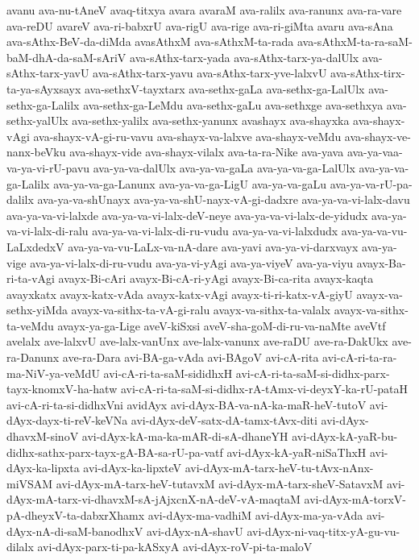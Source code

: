 {avanu
ava-nu-tAneV
avaq-titxya
avara
avaraM
ava-ralilx
ava-ranunx
ava-ra-vare
ava-reDU
avareV
ava-ri-babxrU
ava-rigU
ava-rige
ava-ri-giMta
avaru
ava-sAna
ava-sAthx-BeV-da-diMda
avasAthxM
ava-sAthxM-ta-rada
ava-sAthxM-ta-ra-saM-baM-dhA-da-saM-sAriV
ava-sAthx-tarx-yada
ava-sAthx-tarx-ya-dalUlx
ava-sAthx-tarx-yavU
ava-sAthx-tarx-yavu
ava-sAthx-tarx-yve-lalxvU
ava-sAthx-tirx-ta-ya-sAyxsayx
ava-sethxV-tayxtarx
ava-sethx-gaLa
ava-sethx-ga-LalUlx
ava-sethx-ga-Lalilx
ava-sethx-ga-LeMdu
ava-sethx-gaLu
ava-sethxge
ava-sethxya
ava-sethx-yalUlx
ava-sethx-yalilx
ava-sethx-yanunx
avashayx
ava-shayxka
ava-shayx-vAgi
ava-shayx-vA-gi-ru-vavu
ava-shayx-va-lalxve
ava-shayx-veMdu
ava-shayx-ve-nanx-beVku
ava-shayx-vide
ava-shayx-vilalx
ava-ta-ra-Nike
ava-yava
ava-ya-vaa-va-ya-vi-rU-pavu
ava-ya-va-dalUlx
ava-ya-va-gaLa
ava-ya-va-ga-LalUlx
ava-ya-va-ga-Lalilx
ava-ya-va-ga-Lanunx
ava-ya-va-ga-LigU
ava-ya-va-gaLu
ava-ya-va-rU-pa-dalilx
ava-ya-va-shUnayx
ava-ya-va-shU-nayx-vA-gi-dadxre
ava-ya-va-vi-lalx-davu
ava-ya-va-vi-lalxde
ava-ya-va-vi-lalx-deV-neye
ava-ya-va-vi-lalx-de-yidudx
ava-ya-va-vi-lalx-di-ralu
ava-ya-va-vi-lalx-di-ru-vudu
ava-ya-va-vi-lalxdudx
ava-ya-va-vu-LaLxdedxV
ava-ya-va-vu-LaLx-va-nA-dare
ava-yavi
ava-ya-vi-darxvayx
ava-ya-vige
ava-ya-vi-lalx-di-ru-vudu
ava-ya-vi-yAgi
ava-ya-viyeV
ava-ya-viyu
avayx-Ba-ri-ta-vAgi
avayx-Bi-cAri
avayx-Bi-cA-ri-yAgi
avayx-Bi-ca-rita
avayx-kaqta
avayxkatx
avayx-katx-vAda
avayx-katx-vAgi
avayx-ti-ri-katx-vA-giyU
avayx-va-sethx-yiMda
avayx-va-sithx-ta-vA-gi-ralu
avayx-va-sithx-ta-valalx
avayx-va-sithx-ta-veMdu
avayx-ya-ga-Lige
aveV-kiSxsi
aveV-sha-goM-di-ru-va-naMte
aveVtf
avelalx
ave-lalxvU
ave-lalx-vanUnx
ave-lalx-vanunx
ave-raDU
ave-ra-DakUkx
ave-ra-Danunx
ave-ra-Dara
avi-BA-ga-vAda
avi-BAgoV
avi-cA-rita
avi-cA-ri-ta-ra-ma-NiV-ya-veMdU
avi-cA-ri-ta-saM-sididhxH
avi-cA-ri-ta-saM-si-didhx-parx-tayx-knomxV-ha-hatw
avi-cA-ri-ta-saM-si-didhx-rA-tAmx-vi-deyxY-ka-rU-pataH
avi-cA-ri-ta-si-didhxVni
avidAyx
avi-dAyx-BA-va-nA-ka-maR-heV-tutoV
avi-dAyx-dayx-ti-reV-keVNa
avi-dAyx-deV-satx-dA-tamx-tAvx-diti
avi-dAyx-dhavxM-sinoV
avi-dAyx-kA-ma-ka-mAR-di-sA-dhaneYH
avi-dAyx-kA-yaR-bu-didhx-sathx-parx-tayx-gA-BA-sa-rU-pa-vatf
avi-dAyx-kA-yaR-niSaThxH
avi-dAyx-ka-lipxta
avi-dAyx-ka-lipxteV
avi-dAyx-mA-tarx-heV-tu-tAvx-nAnx-miVSAM
avi-dAyx-mA-tarx-heV-tutavxM
avi-dAyx-mA-tarx-sheV-SatavxM
avi-dAyx-mA-tarx-vi-dhavxM-sA-jAjxcnX-nA-deV-vA-maqtaM
avi-dAyx-mA-torxV-pA-dheyxV-ta-dabxrXhamx
avi-dAyx-ma-vadhiM
avi-dAyx-ma-ya-vAda
avi-dAyx-nA-di-saM-banodhxV
avi-dAyx-nA-shavU
avi-dAyx-ni-vaq-titx-yA-gu-vu-dilalx
avi-dAyx-parx-ti-pa-kASxyA
avi-dAyx-roV-pi-ta-maloV
}
